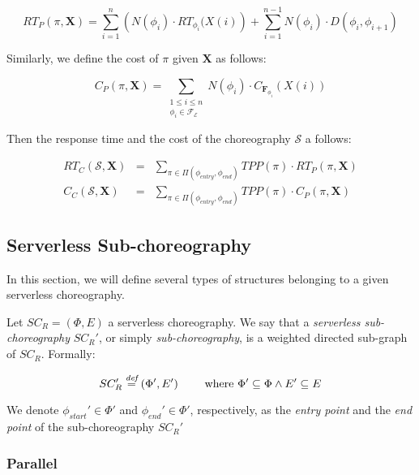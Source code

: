 \begin{equation}
	RT_P(\pi, \textbf{X}) = \sum_{i = 1}^n \left(  N(\phi_i) \cdot RT_{\phi_i} (X(i) \right)  + \sum_{i = 1}^{n-1} N(\phi_i) \cdot D(\phi_i,\phi_{i+1})
\end{equation}

Similarly, we define the cost of $\pi$ given $\textbf{X}$ as follows:

\begin{equation}
	C_P(\pi, \textbf{X}) = \sum_{\substack{1\le i\le n\\ \phi_i \in \mathscr{F_E}}} N(\phi_i) \cdot C_{\textbf{F}_{\phi_i}} (X(i))
\end{equation}


Then the response time and the cost of the choreography $\mathcal{S}$ a follows:

\begin{eqnarray}
	RT_C(\mathcal{S}, \textbf{X}) & = & \sum_{\pi \in \Pi(\phi_{entry}, \phi_{end})} TPP(\pi) \cdot RT_{P}(\pi, \textbf{X}) \\
	C_C(\mathcal{S}, \textbf{X}) & = & \sum_{\pi \in \Pi(\phi_{entry}, \phi_{end})} TPP(\pi) \cdot C_{P}(\pi, \textbf{X}) 
\end{eqnarray}

\subsection{Serverless Sub-choreography}

In this section, we will define several types of structures belonging to a given serverless choreography. 

Let $SC_R = (\Phi,E)$ a serverless choreography. We say that a \textit{serverless sub-choreography} $SC_R'$, or simply \textit{sub-choreography}, is a weighted directed sub-graph of $SC_R$. Formally:

\begin{equation}
	SC_R' \overset{\textit{def}}{=} (\Phi',E') \qquad \text{ where } \Phi' \subseteq \Phi \wedge E' \subseteq E
\end{equation}

We denote $\phi_{start}' \in \Phi'$ and $\phi_{end}' \in \Phi'$, respectively, as the \textit{entry point} and the \textit{end point} of the sub-choreography $SC_R'$

\subsubsection{Parallel}

